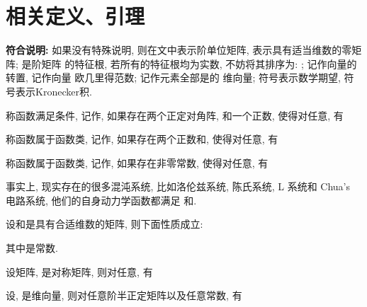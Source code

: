 \section{相关定义、引理}
    {\bf 符合说明:} 如果没有特殊说明, 则在文中表示阶单位矩阵, 表示具有适当维数的零矩阵; 是阶矩阵 的特征根, 若所有的特征根均为实数, 不妨将其排序为: ; 记作向量的转置,  记作向量 欧几里得范数; 记作元素全部是的 维向量; 符号表示数学期望, 符号表示Kronecker积.
    \begin{defn}\label{quad}
        称函数满足条件, 记作, 如果存在两个正定对角阵, 和一个正数, 使得对任意, 有

    \end{defn}
    \begin{defn}\label{lipuxici}
        称函数属于函数类, 记作, 如果存在两个正数和, 使得对任意, 有
        \begin{comment}
            \| f(x)-f(y)\|\leq l_{1}\| x-y\|,\\
            \| f(x)+f(y)\|\leq l_{2}\| x+y\|.
        \end{comment}
        称函数属于函数类, 记作, 如果存在非零常数, 使得对任意, 有
        \begin{comment}
            (x-y)^\top(g(x)-g(y))\geq \sigma(x-y)^\top(x-y).
        \end{comment}
    \end{defn}
    事实上, 现实存在的很多混沌系统, 比如洛伦兹系统, 陈氏系统, L 系统和 Chua's 电路系统, 他们的自身动力学函数都满足 和.
    \begin{lem}\label{lem:1}{\rm{}}
        设和是具有合适维数的矩阵, 则下面性质成立:
        \begin{comment}
            \left\{
            \begin{commented}
            &(aA)\otimes B=A\otimes(aB);\\
            &(A+B)\otimes C=A\otimes C+B\otimes C;\\
            &(A\otimes B)(C\otimes D)=(AC)\otimes (BD);
            \end{commented}
            \right.
            \end{comment}
        其中是常数.
    \end{lem}
    \begin{lem}\label{lem:2}{\rm{}}
        设矩阵, 是对称矩阵, 则对任意, 有
        \begin{comment}
            \lambda_{1}(A)\cdot\lambda_{1}(B)x^{\top}x\leq x^{\top}(A\otimes B)x\leq \lambda_{n}(A)\cdot\lambda_{m}(B)x^{\top}x.
        \end{comment}
    \end{lem}
    \begin{lem}{\rm{}}\label{lem_leq}
           设, 是维向量, 则对任意阶半正定矩阵以及任意常数, 有
            \begin{comment}
            2x^{\top}Py\leq\mu x^{\top}Px+\frac{1}{\mu}y^{\top}Py
            \end{comment}
    \end{lem}


